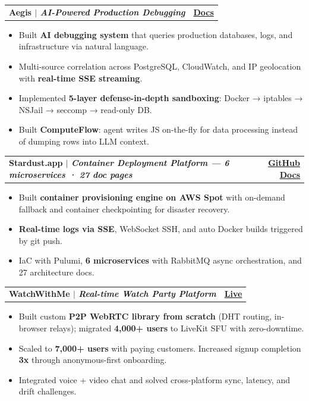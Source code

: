 \documentclass[letterpaper,11pt]{article}
\makeatletter
\newcommand{\resumeItem}[1]{
  \item\small{\color{DarkGray}
    {#1 \vspace{-2pt}}
  }
}
\newcommand{\resumeProjectHeading}[2]{
    \item
    \begin{tabular*}{0.97\textwidth}{l@{\extracolsep{\fill}}r}
      \small\textbf{#1} & \color{PrimaryBlue}#2 \\
    \end{tabular*}\vspace{-7pt}
}
\newcommand{\resumeItemListStart}{\begin{itemize}}
\newcommand{\resumeItemListEnd}{\end{itemize}\vspace{-5pt}}
\makeatother
\begin{document}
      \resumeProjectHeading
          {\color{black}Aegis $|$ \emph{\small AI-Powered Production Debugging}}{\href{https://harishkumar.info/docs/aegis/}{\textbf{Docs}}}
          \resumeItemListStart
            \resumeItem{Built \textbf{\color{black}AI debugging system} that queries production databases, logs, and infrastructure via natural language.}
            \resumeItem{Multi-source correlation across PostgreSQL, CloudWatch, and IP geolocation with \textbf{\color{black}real-time SSE streaming}.}
            \resumeItem{Implemented \textbf{\color{black}5-layer defense-in-depth sandboxing}: Docker → iptables → NSJail → seccomp → read-only DB.}
            \resumeItem{Built \textbf{\color{black}ComputeFlow}: agent writes JS on-the-fly for data processing instead of dumping rows into LLM context.}
          \resumeItemListEnd
      \vspace{2pt}

      \resumeProjectHeading
          {\color{black}Stardust.app $|$ \emph{\small Container Deployment Platform — 6 microservices · 27 doc pages}}{\href{https://github.com/thelonewolf123/stardust.app}{\textbf{GitHub}} \quad \href{https://harishkumar.info/docs/stardust/}{\textbf{Docs}}}
          \resumeItemListStart
            \resumeItem{Built \textbf{\color{black}container provisioning engine on AWS Spot} with on-demand fallback and container checkpointing for disaster recovery.}
            \resumeItem{\textbf{\color{black}Real-time logs via SSE}, WebSocket SSH, and auto Docker builds triggered by git push.}
            \resumeItem{IaC with Pulumi, \textbf{\color{black}6 microservices} with RabbitMQ async orchestration, and 27 architecture docs.}
          \resumeItemListEnd
      \vspace{2pt}

      \resumeProjectHeading
          {\color{black}WatchWithMe $|$ \emph{\small Real-time Watch Party Platform}}{\href{https://www.watchwithme.in}{\textbf{Live}}}
          \resumeItemListStart
            \resumeItem{Built custom \textbf{\color{black}P2P WebRTC library from scratch} (DHT routing, in-browser relays); migrated \textbf{\color{black}4,000+ users} to LiveKit SFU with zero-downtime.}
            \resumeItem{Scaled to \textbf{\color{black}7,000+ users} with paying customers. Increased signup completion \textbf{\color{black}3x} through anonymous-first onboarding.}
            \resumeItem{Integrated voice + video chat and solved cross-platform sync, latency, and drift challenges.}
          \resumeItemListEnd
\end{document}
